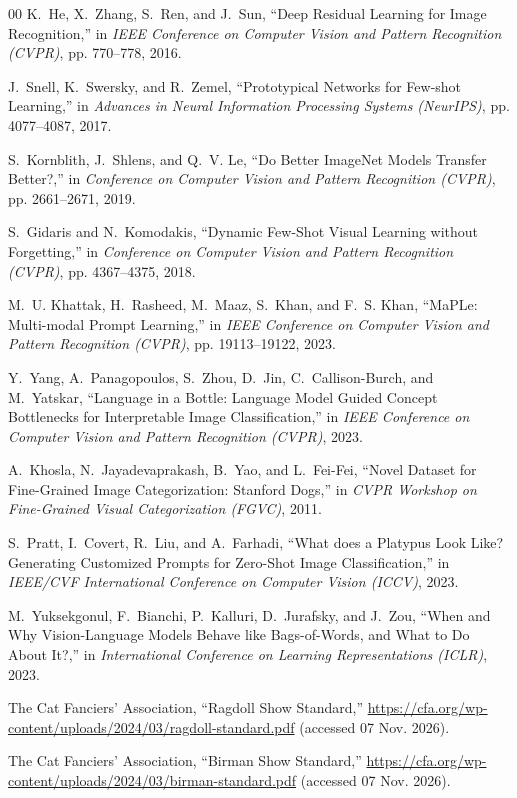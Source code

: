 \documentclass[conference]{IEEEtran}
\begin{document}
\begin{thebibliography}{00}
K.~He, X.~Zhang, S.~Ren, and J.~Sun, ``Deep Residual Learning for Image Recognition,'' in \emph{IEEE Conference on Computer Vision and Pattern Recognition (CVPR)}, pp. 770--778, 2016.

J.~Snell, K.~Swersky, and R.~Zemel, ``Prototypical Networks for Few-shot Learning,'' in \emph{Advances in Neural Information Processing Systems (NeurIPS)}, pp. 4077--4087, 2017.

S.~Kornblith, J.~Shlens, and Q.~V. Le, ``Do Better ImageNet Models Transfer Better?,'' in \emph{Conference on Computer Vision and Pattern Recognition (CVPR)}, pp. 2661--2671, 2019.

S.~Gidaris and N.~Komodakis, ``Dynamic Few-Shot Visual Learning without Forgetting,'' in \emph{Conference on Computer Vision and Pattern Recognition (CVPR)}, pp. 4367--4375, 2018.

M.~U. Khattak, H.~Rasheed, M.~Maaz, S.~Khan, and F.~S. Khan, ``MaPLe: Multi-modal Prompt Learning,'' in \emph{IEEE Conference on Computer Vision and Pattern Recognition (CVPR)}, pp. 19113--19122, 2023.

Y.~Yang, A.~Panagopoulos, S.~Zhou, D.~Jin, C.~Callison-Burch, and M.~Yatskar, ``Language in a Bottle: Language Model Guided Concept Bottlenecks for Interpretable Image Classification,'' in \emph{IEEE Conference on Computer Vision and Pattern Recognition (CVPR)}, 2023.

A.~Khosla, N.~Jayadevaprakash, B.~Yao, and L.~Fei-Fei, ``Novel Dataset for Fine-Grained Image Categorization: Stanford Dogs,'' in \emph{CVPR Workshop on Fine-Grained Visual Categorization (FGVC)}, 2011.

S.~Pratt, I.~Covert, R.~Liu, and A.~Farhadi, ``What does a Platypus Look Like? Generating Customized Prompts for Zero-Shot Image Classification,'' in \emph{IEEE/CVF International Conference on Computer Vision (ICCV)}, 2023.

M.~Yuksekgonul, F.~Bianchi, P.~Kalluri, D.~Jurafsky, and J.~Zou, ``When and Why Vision-Language Models Behave like Bags-of-Words, and What to Do About It?,'' in \emph{International Conference on Learning Representations (ICLR)}, 2023.

The Cat Fanciers' Association, ``Ragdoll Show Standard,'' \url{https://cfa.org/wp-content/uploads/2024/03/ragdoll-standard.pdf} (accessed 07 Nov. 2026).

The Cat Fanciers' Association, ``Birman Show Standard,'' \url{https://cfa.org/wp-content/uploads/2024/03/birman-standard.pdf} (accessed 07 Nov. 2026).

\end{thebibliography}
\end{document}
